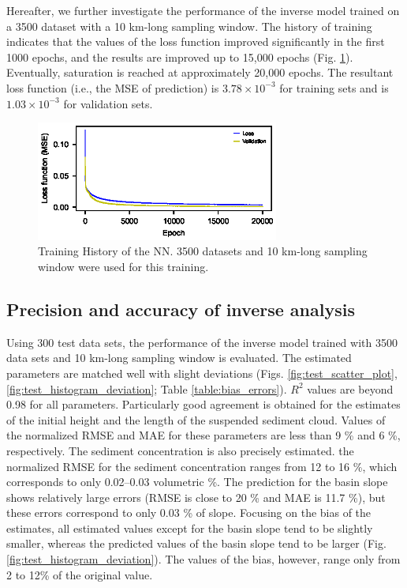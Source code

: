 Hereafter, we further investigate the performance of the inverse model trained on a 3500 dataset with a 10 km-long sampling window. The history of training indicates that the values of the loss function improved significantly in the first 1000 epochs, and the results are improved up to 15,000 epochs (Fig. \ref{fig:training_history}). Eventually, saturation is reached at approximately 20,000 epochs. The resultant loss function (i.e., the MSE of prediction) is $3.78 \times 10^{-3}$ for training sets and is $1.03 \times 10^{-3}$ for validation sets.

\begin{figure}[t]
  \includegraphics[width=8cm]{fig06.eps}
  \caption{Training History of the NN. 3500 datasets and 10 km-long sampling window were used for this training.}
  \label{fig:training_history}
\end{figure}


\subsection{Precision and accuracy of inverse analysis}
Using 300 test data sets, the performance of the inverse model trained with 3500 data sets and 10 km-long sampling window is evaluated. The estimated parameters are matched well with slight deviations (Figs. \ref{fig:test_scatter_plot}, \ref{fig:test_histogram_deviation}; Table \ref{table:bias_errors}). $R^2$ values are beyond 0.98 for all parameters. Particularly good agreement is obtained for the estimates of the initial height and the length of the suspended sediment cloud. Values of the normalized RMSE and MAE for these parameters are less than 9 \% and 6 \%, respectively. The sediment concentration is also precisely estimated. the normalized RMSE for the sediment concentration ranges from 12 to 16 \%, which corresponds to only 0.02--0.03 volumetric \%. The prediction for the basin slope shows relatively large errors (RMSE is close to 20 \% and MAE is 11.7 \%), but these errors correspond to only 0.03 \% of slope. Focusing on the bias of the estimates, all estimated values except for the basin slope tend to be slightly smaller, whereas the predicted values of the basin slope tend to be  larger (Fig. \ref{fig:test_histogram_deviation}). The values of the bias, however, range only from 2 to 12\% of the original value. 

